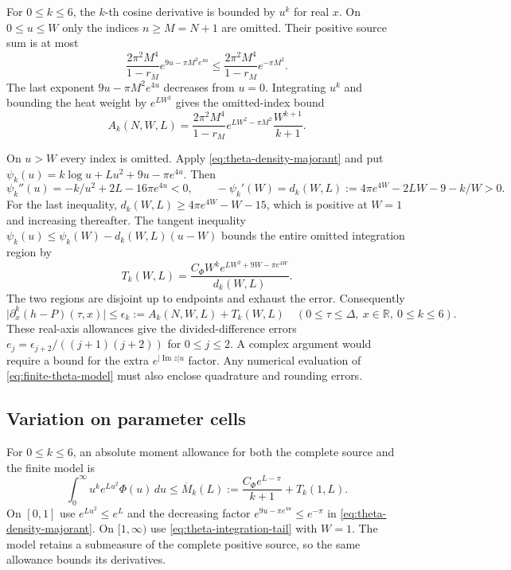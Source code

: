 For \(0\le k\le 6\), the \(k\)-th cosine derivative is bounded by
\(u^k\) for real \(x\). On \(0\le u\le W\) only the indices
\(n\ge M=N+1\) are omitted. Their positive source sum is at most
\[
\frac{2\pi^2M^4}{1-r_M}e^{9u-\pi M^2 e^{4u}}
\le \frac{2\pi^2M^4}{1-r_M}e^{-\pi M^2}.
\]
The last exponent \(9u-\pi M^2e^{4u}\) decreases from \(u=0\).
Integrating \(u^k\) and bounding the heat weight by \(e^{LW^2}\)
gives the omitted-index bound
\begin{equation}\label{eq:theta-index-tail}
A_k(N,W,L)=
\frac{2\pi^2M^4}{1-r_M}
e^{LW^2-\pi M^2}\frac{W^{k+1}}{k+1}.
\end{equation}

On \(u>W\) every index is omitted. Apply
\eqref{eq:theta-density-majorant} and put
\(\psi_k(u)=k\log u+Lu^2+9u-\pi e^{4u}\). Then
\[
\psi_k''(u)=-k/u^2+2L-16\pi e^{4u}<0,\qquad
-\psi_k'(W)=d_k(W,L):=4\pi e^{4W}-2LW-9-k/W>0 .
\]
For the last inequality, \(d_k(W,L)\ge 4\pi e^{4W}-W-15\),
which is positive at \(W=1\) and increasing thereafter.
The tangent inequality
\(\psi_k(u)\le\psi_k(W)-d_k(W,L)(u-W)\) bounds the entire
omitted integration region by
\begin{equation}\label{eq:theta-integration-tail}
T_k(W,L)=
\frac{C_\Phi W^k e^{LW^2+9W-\pi e^{4W}}}{d_k(W,L)} .
\end{equation}
The two regions are disjoint up to endpoints and exhaust the
error. Consequently
\begin{equation}\label{eq:theta-tail}
\bigl|\partial_x^k(h-P)(\tau,x)\bigr|\le
\epsilon_k:=A_k(N,W,L)+T_k(W,L)
\quad(0\le\tau\le\Delta,\ x\in\mathbb R,\ 0\le k\le 6).
\end{equation}
These real-axis allowances give the divided-difference errors
\(e_j=\epsilon_{j+2}/((j+1)(j+2))\) for \(0\le j\le 2\).
A complex argument would require a bound for the extra
\(e^{|\operatorname{Im}z|u}\) factor. Any numerical evaluation of
\eqref{eq:finite-theta-model} must also enclose quadrature and
rounding errors.

\subsection{Variation on parameter cells}

For \(0\le k\le 6\), an absolute moment allowance for both the
complete source and the finite model is
\begin{equation}\label{eq:theta-moment}
\int_0^\infty u^k e^{Lu^2}\Phi(u)\,du
\le \overline M_k(L):=\frac{C_\Phi e^{L-\pi}}{k+1}+T_k(1,L).
\end{equation}
On \([0,1]\) use \(e^{Lu^2}\le e^L\) and the decreasing
factor \(e^{9u-\pi e^{4u}}\le e^{-\pi}\) in
\eqref{eq:theta-density-majorant}. On \([1,\infty)\) use
\eqref{eq:theta-integration-tail} with \(W=1\). The model retains a
submeasure of the complete positive source, so the same allowance
bounds its derivatives.

